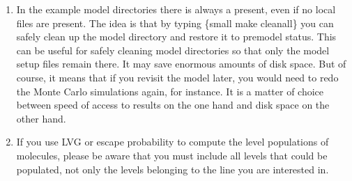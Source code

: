 \documentclass[letterpaper,10pt,english]{sphinxmanual}
\begin{document}
\begin{enumerate}
\item {} 
In the example model directories there is always a 
present, even if no local  files are present. The idea
is that by typing \{small make cleanall\} you can safely clean up the
model directory and restore it to pre\sphinxhyphen{}model status. This can be useful
for safely cleaning model directories so that only the model setup files
remain there. It may save enormous amounts of disk space. But of course,
it means that if you revisit the model later, you would need to redo
the Monte Carlo simulations again, for instance. It is a matter of
choice between speed of access to results on the one hand and disk space
on the other hand.

\item {} 
If you use LVG or escape probability to compute the level populations
of molecules, please be aware that you must include all levels that could
be populated, not only the levels belonging to the line you are interested
in.

\end{enumerate}
\end{document}
